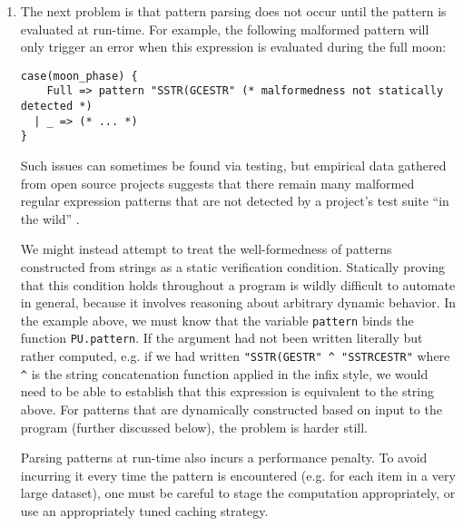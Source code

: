 \begin{enumerate}
\item The next problem is that pattern parsing does not occur until the pattern is evaluated at run-time. For example, the following malformed pattern will only trigger an error when this expression is evaluated during the full moon: %

\begin{lstlisting}[numbers=none]
case(moon_phase) {
    Full => pattern "SSTR(GCESTR" (* malformedness not statically detected *)
  | _ => (* ... *)
}
\end{lstlisting}
Such issues can sometimes be found via testing, but empirical data gathered from open source projects suggests that there remain many malformed regular expression patterns that are not detected by a project's test suite ``in the wild'' \cite{spishak2012type}. 

We might instead attempt to treat the well-formedness of patterns constructed from strings as a static verification condition. Statically proving that this condition holds throughout a program is wildly difficult to automate in general, because it involves reasoning about arbitrary dynamic behavior. In the example above, we must know that the variable \lstinline{pattern} binds the function \lstinline{PU.pattern}. If the argument had not been written literally but rather computed, e.g. if we had written \lstinline{"SSTR(GESTR" ^ "SSTRCESTR"} where \lstinline{^} is the string concatenation function applied in the infix style, we would need to be able to establish that this expression is equivalent to the string above. For patterns that are dynamically constructed based on input to the program (further discussed below), the problem is harder still.

Parsing patterns at run-time also incurs a performance penalty. To avoid incurring it every time the pattern is encountered (e.g. for each item in a very large dataset), one must be careful to stage the computation appropriately, or use an appropriately tuned caching strategy. %


\end{enumerate}
